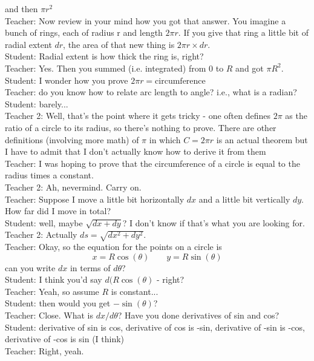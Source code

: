 and then $\pi r^2$\\
Teacher: Now review in your mind how you got that answer. You imagine a bunch of rings, each of radius r and length $2 \pi r$.
If you give that ring a little bit of radial extent $dr$, the area of that new thing is $2 \pi r \times dr$.\\
Student: Radial extent is how thick the ring is, right?\\
Teacher: Yes. Then you summed (i.e. integrated) from 0 to $R$ and got $\pi R^2$.\\
Student: I wonder how you prove $2\pi r = \text{circumference}$\\
Teacher: do you know how to relate arc length to angle?
i.e., what is a radian?\\
Student: barely...\\
Teacher 2: Well, that's the point where it gets tricky - one often defines $2\pi$ as the ratio of a circle to its radius, so there's nothing to prove.
There are other definitions (involving more math) of $\pi$ in which $C = 2\pi r$ is an actual theorem but I have to admit that I don't actually know how to derive it from them\\
Teacher: I was hoping to prove that the circumference of a circle is equal to the radius times a constant.\\
Teacher 2: Ah, nevermind. Carry on.\\
Teacher: Suppose I move a little bit horizontally $dx$ and a little bit vertically $dy$.
How far did I move in total?\\
Student: well, maybe $\sqrt{dx + dy}$? I don't know if that's what you are looking for.\\
Teacher 2: Actually $ds=\sqrt{dx^2+dy^2}$.\\
Teacher: Okay, so the equation for the points on a circle is $$x = R \cos(\theta) \qquad y = R \sin(\theta)$$
 can you write $dx$ in terms of $d\theta$?\\
Student:  I think you'd say $d(R \cos(\theta)$ - right?\\
Teacher: Yeah, so assume $R$ is constant...\\
Student: then would you get $-\sin(\theta)$?\\
Teacher: Close. What is $dx / d\theta$? Have you done derivatives of sin and cos?\\
Student: derivative of sin is cos, derivative of cos is -sin, derivative of -sin is -cos, derivative of -cos is sin (I think)\\
Teacher: Right, yeah. \\
